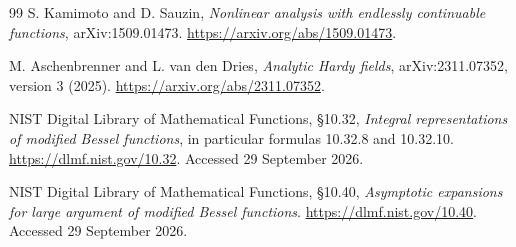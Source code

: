 \documentclass[11pt,a4paper]{article}
\theoremstyle{definition}
\theoremstyle{remark}
\numberwithin{equation}{section}
\begin{document}
\begin{thebibliography}{99}
S. Kamimoto and D. Sauzin, \emph{Nonlinear analysis with endlessly continuable functions}, arXiv:1509.01473.
\url{https://arxiv.org/abs/1509.01473}.

M. Aschenbrenner and L. van den Dries, \emph{Analytic Hardy fields},
arXiv:2311.07352, version 3 (2025).
\url{https://arxiv.org/abs/2311.07352}.

NIST Digital Library of Mathematical Functions, \S10.32,
\emph{Integral representations of modified Bessel functions},
in particular formulas 10.32.8 and 10.32.10.
\url{https://dlmf.nist.gov/10.32}.
Accessed 29 September 2026.

NIST Digital Library of Mathematical Functions, \S10.40,
\emph{Asymptotic expansions for large argument of modified Bessel functions}.
\url{https://dlmf.nist.gov/10.40}.
Accessed 29 September 2026.
\end{thebibliography}
\end{document}
